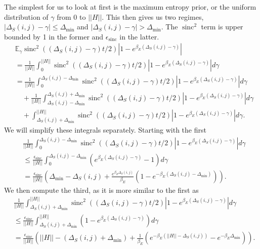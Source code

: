 \documentclass{article}
\newcommand{\parens}[1]{\left( #1 \right)}
\newcommand{\abs}[1]{\left| #1 \right|}
\newcommand{\norm}[1]{\left| \left| #1 \right| \right|}
\DeclareMathOperator{\sinc}{sinc}
\begin{document}
The simplest for us to look at first is the maximum entropy prior, or the uniform distribution of $\gamma$ from 0 to $\norm{H}$. This then gives us two regimes, $|\Delta_S(i,j) - \gamma| \leq \Delta_{\min}$ and $|\Delta_S(i,j) - \gamma| > \Delta_{\min}$. The $\sinc^2$ term is upper bounded by 1 in the former and $\epsilon_{\sinc}$ in the latter. 
\begin{align}
    &\mathbb{E}_{\gamma} \sinc^2((\Delta_S(i,j) - \gamma)t/2) \abs{1 - e^{\beta_E (\Delta_S(i,j) - \gamma)}} \nonumber \\
    &= \frac{1}{\norm{H}} \int_0^{\norm{H}} \sinc^2((\Delta_S(i,j) - \gamma)t/2)\abs{1 - e^{\beta_E (\Delta_S(i,j) - \gamma)}} d\gamma \\
    &= \frac{1}{\norm{H}} \int_0^{\Delta_S(i,j) - \Delta_{\min}} \sinc^2((\Delta_S(i,j) - \gamma)t/2)\abs{1 - e^{\beta_E (\Delta_S(i,j) - \gamma)}} d\gamma \nonumber \\
    &\quad + \frac{1}{\norm{H}} \int_{\Delta_S(i,j) - \Delta_{\min}}^{\Delta_S(i,j) + \Delta_{\min}} \sinc^2((\Delta_S(i,j) - \gamma)t/2)\abs{1 - e^{\beta_E (\Delta_S(i,j) - \gamma)}} d\gamma \nonumber \\
    &\quad + \int_{\Delta_S(i,j) + \Delta_{\min}}^{\norm{H}} \sinc^2((\Delta_S(i,j) - \gamma)t/2)\abs{1 - e^{\beta_E (\Delta_S(i,j) - \gamma)}} d\gamma.
\end{align}
We will simplify these integrals separately. Starting with the first
\begin{align}
    &\frac{1}{\norm{H}} \int_0^{\Delta_S(i,j) - \Delta_{\min}} \sinc^2((\Delta_S(i,j) - \gamma)t/2)\abs{1 - e^{\beta_E (\Delta_S(i,j) - \gamma)}} d\gamma \nonumber \\
    &\leq \frac{\epsilon_{\sinc}}{\norm{H}} \int_0^{\Delta_S(i,j) - \Delta_{\min}} \left(e^{\beta_E(\Delta_S(i,j) - \gamma)} - 1\right) d\gamma \\
    &= \frac{\epsilon_{\sinc}}{\norm{H}}\parens{\Delta_{\min} - \Delta_S(i,j) + \frac{e^{\beta_E \Delta_S(i,j)}}{\beta_E}\left( 1 - e^{-\beta_E(\Delta_S(i,j) - \Delta_{\min})} \right)}.
\end{align}
We then compute the third, as it is more similar to the first as
\begin{align}
    &\frac{1}{\norm{H}} \int_{\Delta_S(i,j) + \Delta_{\min}}^{\norm{H}} \sinc^2((\Delta_S(i,j) - \gamma)t/2) \abs{1 - e^{\beta_E(\Delta_S(i,j) - \gamma)}} d\gamma \nonumber \\
    &\leq \frac{\epsilon_{\sinc}}{\norm{H}} \int_{\Delta_S(i,j) + \Delta_{\min}}^{\norm{H}} \left(1 - e^{\beta_E (\Delta_S(i,j) - \gamma)} \right) d\gamma \\
    &=\frac{\epsilon_{\sinc}}{\norm{H}}\parens{\norm{H} - (\Delta_S(i,j) + \Delta_{\min}) + \frac{1}{\beta_E} \left(e^{-\beta_E(\norm{H} - \Delta_S(i,j))} - e^{-\beta_E \Delta_{\min}} \right) }.
\end{align}
\end{document}
